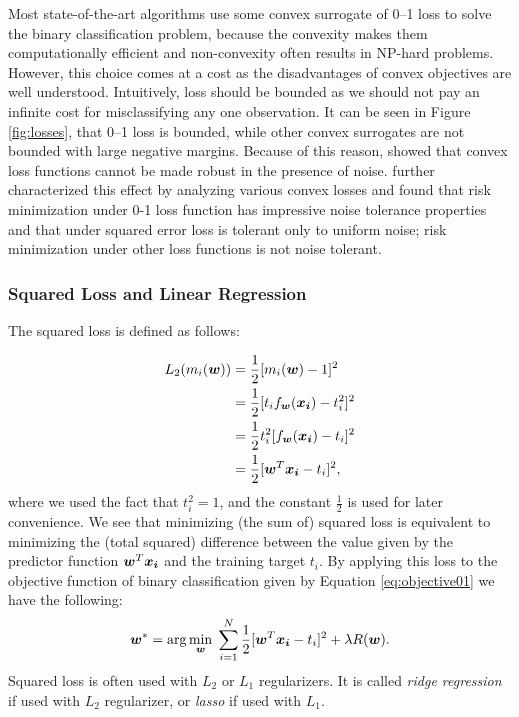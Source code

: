 Most state-of-the-art algorithms use some convex surrogate of 0--1 loss to solve the binary classification problem, because the convexity makes them computationally efficient \cite{Bartlett} and non-convexity often results in NP-hard problems. However, this choice comes at a cost as the disadvantages of convex objectives are well understood. Intuitively, loss should be bounded as we should not pay an infinite cost for misclassifying any one observation. It can be seen in Figure \ref{fig:losses}, that 0--1 loss is bounded, while other convex surrogates are not bounded with large negative margins. Because of this reason, \cite{outliers} showed that convex loss functions cannot be made robust in the presence of  noise. \cite{outliers2} further characterized this effect by analyzing various convex losses and found that risk minimization under 0-1 loss function has impressive noise tolerance properties and that under squared error loss is tolerant only to uniform noise; risk minimization under other loss functions is not noise tolerant.

\subsubsection{Squared Loss and Linear Regression}

The squared loss is defined as follows:

\[ \begin{split}
L_2(m_i(\boldsymbol{w})) &= \frac{1}{2}[m_i(\boldsymbol{w}) - 1]^2 \\
& = \frac{1}{2}[t_i f_{\boldsymbol{w}}(\boldsymbol{x_i}) - t_i^2]^2 \\
& = \frac{1}{2}t_i^2 [f_{\boldsymbol{w}}(\boldsymbol{x_i}) - t_i]^2 \\
& = \frac{1}{2}[\boldsymbol{w}^T\boldsymbol{x_i} - t_i]^2,
\end{split} \] 
where we used the fact that $t_i^2 = 1$, and the constant $\frac{1}{2}$ is used for later convenience. We see that minimizing (the sum of) squared loss is equivalent to minimizing the (total squared) difference between the value given by the predictor function $\boldsymbol{w}^T\boldsymbol{x_i}$ and the training target $t_i$. By applying this loss to the objective function of binary classification given by Equation \ref{eq:objective01} we have the following:
\begin{equation}
\label{eq:squareobj}
\boldsymbol{w}^* = \arg\min_{\boldsymbol{w}} \; \sum_{i=1}^{N}  \frac{1}{2}[\boldsymbol{w}^T\boldsymbol{x_i} - t_i]^2 + \lambda R(\boldsymbol{w}).
\end{equation}
Squared loss is often used with $L_2$ or $L_1$ regularizers. It is called \emph{ridge regression} if used with $L_2$ regularizer, or \emph{lasso} if used with $L_1$. 

